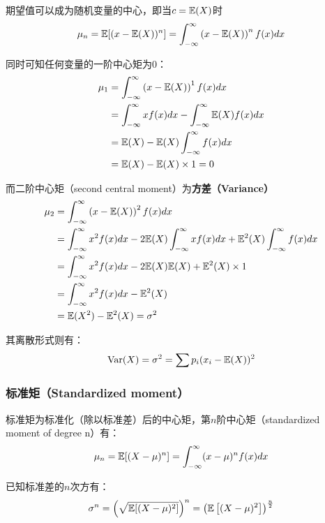 \documentclass[11pt]{article}
\begin{document}
期望值可以成为随机变量的中心，即当$c=\mathbb{E}(X)$时
\begin{equation*}
    \mu_n = \mathbb{E}[(x-\mathbb{E}(X))^n] = \int_{-\infty}^{\infty} \left(x-\mathbb{E}(X)\right)^n f(x) dx
\end{equation*}

同时可知任何变量的一阶中心矩为0：
\begin{align*}
    \mu_1 &= \int_{-\infty}^{\infty} \left(x-\mathbb{E}(X)\right)^1 f(x) dx \\
    &= \int_{-\infty}^{\infty} x f(x) dx - \int_{-\infty}^{\infty} \mathbb{E}(X) f(x) dx \\
    &= \mathbb{E}(X) - \mathbb{E}(X) \int_{-\infty}^{\infty} f(x) dx \\
    &= \mathbb{E}(X) - \mathbb{E}(X) \times 1 = 0 
\end{align*}

而二阶中心矩（second central moment）为\textbf{方差（Variance）}
\begin{align*}
    \mu_2 &= \int_{-\infty}^{\infty} \left(x-\mathbb{E}(X)\right)^2 f(x) dx \\
    &= \int_{-\infty}^{\infty} x^2 f(x)dx - 2 \mathbb{E}(X) \int_{-\infty}^{\infty} x f(x)dx + \mathbb{E}^2(X)\int_{-\infty}^{\infty}f(x)dx \\
    &= \int_{-\infty}^{\infty} x^2 f(x)dx - 2 \mathbb{E}(X) \mathbb{E}(X) + \mathbb{E}^2(X)\times 1 \\
    &= \int_{-\infty}^{\infty} x^2 f(x)dx - \mathbb{E}^2(X) \\
    &= \mathbb{E}(X^2) - \mathbb{E}^2(X) = \sigma^2
\end{align*}

其离散形式则有：
\begin{equation*}
    \text{Var}(X) = \sigma^2 = \sum p_i (x_i - \mathbb{E}(X))^2 
\end{equation*}

\subsubsection*{标准矩（Standardized moment）}

标准矩为标准化（除以标准差）后的中心矩，第$n$阶中心矩（standardized moment of degree n）有：
\begin{equation*}
    \mu_n = \mathbb{E}[(X-\mu)^n] = \int_{-\infty}^{\infty} (x-\mu)^n f(x)dx
\end{equation*}

已知标准差的$n$次方有：
\begin{equation*}
    \sigma^n = \left(\sqrt{\mathbb{E}[(X-\mu)^2]}\right)^n = \left( \mathbb{E} \left[ (X-\mu)^2\right]\right)^{\frac{n}{2}}
\end{equation*}
\end{document}

